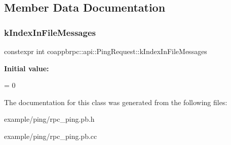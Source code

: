\subsection{Member Data Documentation}
\mbox{\label{classcoappbrpc_1_1api_1_1PingRequest_a85fa53a1739d589b95ea41a1e2880cb2}} 
\subsubsection{\texorpdfstring{k\+Index\+In\+File\+Messages}{kIndexInFileMessages}}
{\footnotesize\ttfamily constexpr int coappbrpc\+::api\+::\+Ping\+Request\+::k\+Index\+In\+File\+Messages\hspace{0.3cm}{\ttfamily [static]}}

{\bfseries Initial value\+:}
\begin{DoxyCode}
=
    0
\end{DoxyCode}


The documentation for this class was generated from the following files\+:\begin{DoxyCompactItemize}
\item 
example/ping/rpc\+\_\+ping.\+pb.\+h\item 
example/ping/rpc\+\_\+ping.\+pb.\+cc\end{DoxyCompactItemize}
